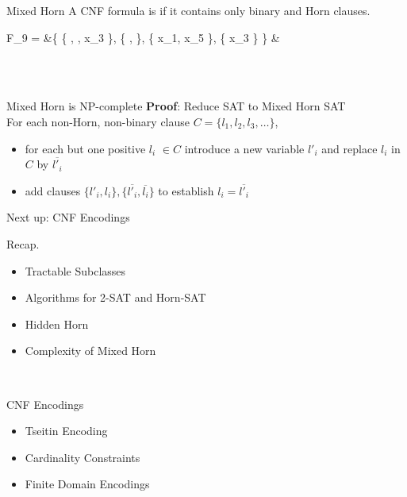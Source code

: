 \documentclass[t]{sdqbeamer}
\begin{document}
\begin{frame}{Mixed Horn}
	A CNF formula is  if it contains only binary and Horn clauses.\\[1ex]
	\begin{example}
		\vspace*{-3ex}
		\begin{flalign*}
			F_9 = &\{ \{ , , x_3 \}, \{ ,  \}, \{ x_1, x_5 \}, \{ x_3 \} \} &
		\end{flalign*}
	\end{example}~\\
	\\[1ex]
	\pause
	\begin{block}{Mixed Horn is NP-complete}
		\textbf{Proof}: Reduce SAT to Mixed Horn SAT\\[1ex]
		For each non-Horn, non-binary clause $C=\{l_1, l_2, l_3, \dots\}$, 
		\pause
		\begin{itemize}\setlength{\itemsep}{1ex}
			\item for each but one positive $l_i$ $\in C$ introduce a new variable $l'_i$ and replace $l_i$ in $C$ by $\overline{l'_i}$
			\item add clauses $\{ l'_i, l_i \}, \{ \overline{l'_i}, \overline{l_i} \}$ to establish $l_i = \overline{l'_i}$
		\end{itemize}
	\end{block}
\end{frame}

\begin{frame}{Next up: CNF Encodings}
	\begin{block}{Recap.}
		\begin{itemize}\setlength{\itemsep}{1ex}
			\item Tractable Subclasses
			\item Algorithms for 2-SAT and Horn-SAT
			\item Hidden Horn 
			\item Complexity of Mixed Horn
		\end{itemize}
	\end{block}~\\
	\pause
	\begin{block}{CNF Encodings}
		\begin{itemize}\setlength{\itemsep}{1ex}
			\item Tseitin Encoding
			\item Cardinality Constraints
			\item Finite Domain Encodings
		\end{itemize}
	\end{block}
\end{frame}
\end{document}
